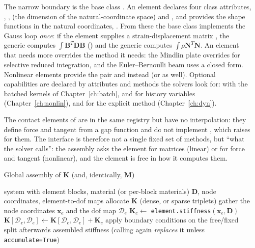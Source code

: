 The narrow boundary is the base class . An element declares four class attributes, , ,  (the dimension of the natural-coordinate space) and , and provides the shape functions in the natural coordinates, . From these the base class implements the Gauss loop \emph{once}: if the element supplies a strain-displacement matrix , the generic  computes $\int\bm B^{T}\bm D\bm B$ () and the generic  computes $\int\rho\bm N^{T}\bm N$. An element that needs more overrides the method it needs: the Mindlin plate overrides  for selective reduced integration, and the Euler--Bernoulli beam uses a closed form. Nonlinear elements provide the pair  and  instead (or as well). Optional capabilities are declared by attributes and methods the solvers look for:  with the batched kernels of Chapter~\ref{ch:batch},  and  for history variables (Chapter~\ref{ch:nonlin}), and  for the explicit method (Chapter~\ref{ch:dyn}).

The contact elements of \fea{} are in the same registry but have no interpolation: they define force and tangent from a gap function and do not implement , which raises  for them. The interface is therefore not a single fixed set of methods, but ``what the solver calls'': the assembly asks the element for matrices (linear) or for force and tangent (nonlinear), and the element is free in how it computes them.


\begin{algbox}{Global assembly of $\bm K$ (and, identically, $\bm M$)}
\begin{pseudo}
\Require system with element blocks, material (or per-block materials) $\bm D$, node coordinates, element-to-dof maps
\State allocate $\bm K$ (dense, or sparse triplets)
  \State gather the node coordinates $\bm x_e$ and the dof map $\mathcal D_e$
  \State $\bm K_e\gets$ \texttt{element.stiffness}$(\bm x_e,\bm D)$ 
  \State $\bm K[\mathcal D_e,\mathcal D_e]\gets\bm K[\mathcal D_e,\mathcal D_e]+\bm K_e$
\EndFor
\State apply boundary conditions on the free/fixed split afterwards
\Ensure assembled stiffness (calling again \emph{replaces} it unless \texttt{accumulate=True})
\end{pseudo}
\end{algbox}

